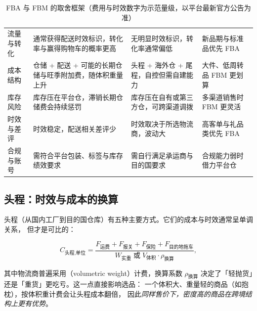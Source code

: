 \begin{table}[htbp]
\centering
\caption{FBA 与 FBM 的取舍框架（费用与时效数字为示范量级，以平台最新官方公告为准）}
\label{tab:cbec-fbafbm}
\small
\begin{tabularx}{\textwidth}{L{1.9cm} L{3.4cm} L{3.4cm} Y}
\toprule
{} &  &  &  \\
\midrule
流量与转化 & 通常获得配送时效标识，转化率与赢得购物车的概率更高 & 无明显时效标识，转化率通常偏低 & 新品期与标准品优先 FBA \\
\addlinespace
成本结构 & 仓储 + 配送 + 可能的长期仓储与旺季附加费，随体积重量上升 & 头程 + 海外仓 + 尾程，自控但需自建能力 & 大件、低周转品 FBM 更划算 \\
\addlinespace
库存风险 & 库存压在平台仓，滞销长期仓储费会持续惩罚 & 库存压在自有或第三方仓，可跨渠道调拨 & 多渠道销售时 FBM 更灵活 \\
\addlinespace
时效与差评 & 时效稳定，配送相关差评少 & 时效取决于所选物流商，波动大 & 高客单与礼品类优先 FBA \\
\addlinespace
合规与账号 & 需符合平台包装、标签与库存绩效要求 & 需自行满足承运商与目的国要求 & 合规能力弱时借力平台仓 \\
\bottomrule
\end{tabularx}
\end{table}

\subsection{头程：时效与成本的换算}

头程（从国内工厂到目的国仓库）有五种主要方式。它们的成本与时效通常呈单调关系，
但才是可比的：

\begin{equation}
C_{\text{头程,单位}} = \frac{F_{\text{运费}} + F_{\text{报关}} + F_{\text{保险}} + F_{\text{目的地拖车}}}{W_{\text{实重}} \;\text{或}\; V_{\text{体积}} \cdot \rho_{\text{换算}}} ,
\label{eq:cbec-leg1}
\end{equation}

其中物流商普遍采用（volumetric weight）计费，换算系数 $\rho_{\text{换算}}$
决定了「轻抛货」还是「重货」更吃亏。这一点直接影响选品：
一个体积大、重量轻的商品（如抱枕），按体积重计费会让头程成本翻倍，
因此\emph{同样售价下，密度高的商品在跨境结构上更有优势}。

